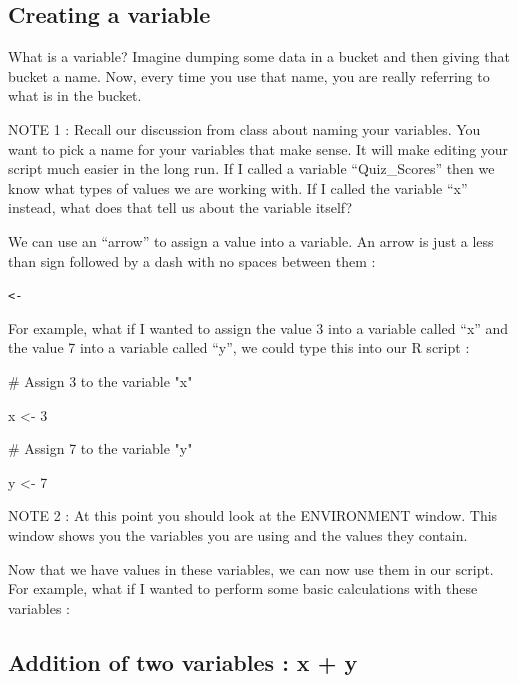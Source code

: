 \documentclass[
  letterpaper,
  DIV=11,
  numbers=noendperiod]{scrreprt}
\newenvironment{Shaded}{\begin{snugshade}}{\end{snugshade}}
\newcommand{\CommentTok}[1]{\textcolor[rgb]{0.37,0.37,0.37}{#1}}
\newcommand{\DecValTok}[1]{\textcolor[rgb]{0.68,0.00,0.00}{#1}}
\newcommand{\NormalTok}[1]{\textcolor[rgb]{0.00,0.23,0.31}{#1}}
\newcommand{\OtherTok}[1]{\textcolor[rgb]{0.00,0.23,0.31}{#1}}
\begin{document}
\subsection*{Creating a variable}\label{creating-a-variable}

What is a variable? Imagine dumping some data in a bucket and then
giving that bucket a name. Now, every time you use that name, you are
really referring to what is in the bucket.

NOTE 1 : Recall our discussion from class about naming your variables.
You want to pick a name for your variables that make sense. It will make
editing your script much easier in the long run. If I called a variable
``Quiz\_Scores'' then we know what types of values we are working with.
If I called the variable ``x'' instead, what does that tell us about the
variable itself?

We can use an ``arrow'' to assign a value into a variable. An arrow is
just a less than sign followed by a dash with no spaces between them :

\texttt{\textless{}-}

For example, what if I wanted to assign the value 3 into a variable
called ``x'' and the value 7 into a variable called ``y'', we could type
this into our R script :

\begin{Shaded}
\begin{Highlighting}[]
\CommentTok{\# Assign 3 to the variable "x"}

\NormalTok{x }\OtherTok{\textless{}{-}} \DecValTok{3}

\CommentTok{\# Assign 7 to the variable "y"}

\NormalTok{y }\OtherTok{\textless{}{-}} \DecValTok{7}
\end{Highlighting}
\end{Shaded}

NOTE 2 : At this point you should look at the ENVIRONMENT window. This
window shows you the variables you are using and the values they
contain.

Now that we have values in these variables, we can now use them in our
script. For example, what if I wanted to perform some basic calculations
with these variables :

\subsection*{Addition of two variables : x +
y}\label{addition-of-two-variables-x-y}
\end{document}
